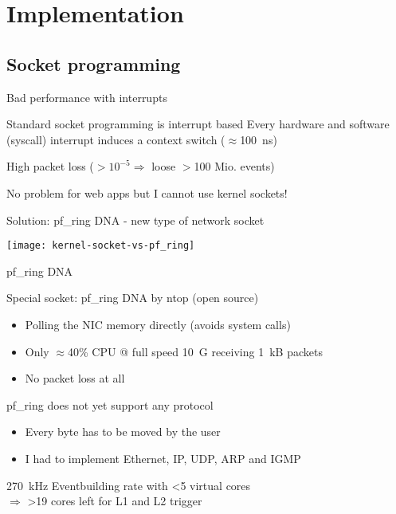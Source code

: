\section{Implementation}
\subsection{Socket programming}
\begin{frame}{Bad performance with interrupts}{}
	\begin{alertblock}{Standard socket programming is interrupt based}
		Every hardware and software (syscall) interrupt induces a context switch
		($\approx$100~ns)\\
		\begin{ergo}
			High packet loss ($>10^{-5} \Rightarrow $ loose $>$100 Mio. events)
		\end{ergo}
	\end{alertblock}
	
	\begin{ergo}
		No problem for web apps but I cannot use kernel sockets!
	\end{ergo}
\end{frame}

\begin{frame}{Solution: pf\_ring DNA - new type of network socket}{}
	\begin{center} 
		\texttt{[image: kernel-socket-vs-pf\_ring]}
	\end{center}
\end{frame}

\begin{frame}{pf\_ring DNA}{}
	\begin{block}{Special socket: pf\_ring DNA by ntop (open source)}
		\begin{itemize}
		  \item Polling the NIC memory directly (avoids system calls)
		  \item Only $\approx$40\% CPU @ full speed 10~G receiving 1~kB packets
		  \item No packet loss at all
		\end{itemize}
	\end{block}
	
	\begin{alertblock}{pf\_ring does not yet support any protocol}
		\begin{itemize}
		  \item Every byte has to be moved by the user
		  \item I had to implement Ethernet, IP, UDP, ARP and IGMP
		\end{itemize}
	\end{alertblock}
	
	\begin{ergo}
		270~kHz Eventbuilding rate with <5 virtual cores \\
		$\Rightarrow$ >19 cores left for L1 and L2 trigger
	\end{ergo}
\end{frame}



